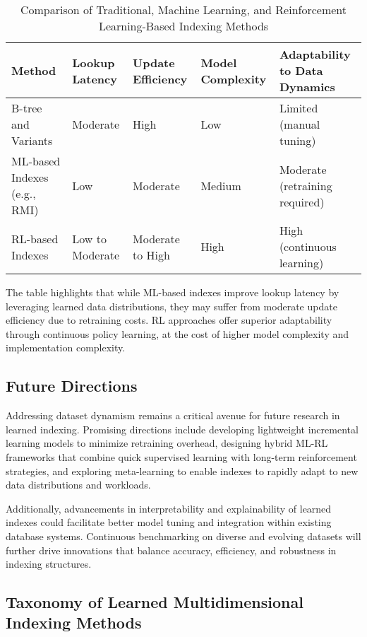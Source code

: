 \documentclass[sigconf]{acmart}
\begin{document}
\begin{table*}[htbp]
\centering
\caption{Comparison of Traditional, Machine Learning, and Reinforcement Learning-Based Indexing Methods}
\label{tab:indexing_comparison}
\begin{adjustbox}{max width=\textwidth}
\begin{tabular}{@{}lllll@{}}
\toprule
Method & Lookup Latency & Update Efficiency & Model Complexity & Adaptability to Data Dynamics \\ \midrule
B-tree and Variants & Moderate & High & Low & Limited (manual tuning) \\
ML-based Indexes (e.g., RMI) & Low & Moderate & Medium & Moderate (retraining required) \\
RL-based Indexes & Low to Moderate & Moderate to High & High & High (continuous learning) \\ \bottomrule
\end{tabular}
\end{adjustbox}
\end{table*}

The table highlights that while ML-based indexes improve lookup latency by leveraging learned data distributions, they may suffer from moderate update efficiency due to retraining costs. RL approaches offer superior adaptability through continuous policy learning, at the cost of higher model complexity and implementation complexity.

\subsection{Future Directions}

Addressing dataset dynamism remains a critical avenue for future research in learned indexing. Promising directions include developing lightweight incremental learning models to minimize retraining overhead, designing hybrid ML-RL frameworks that combine quick supervised learning with long-term reinforcement strategies, and exploring meta-learning to enable indexes to rapidly adapt to new data distributions and workloads.

Additionally, advancements in interpretability and explainability of learned indexes could facilitate better model tuning and integration within existing database systems. Continuous benchmarking on diverse and evolving datasets will further drive innovations that balance accuracy, efficiency, and robustness in indexing structures.

\subsection{Taxonomy of Learned Multidimensional Indexing Methods}
\end{document}
